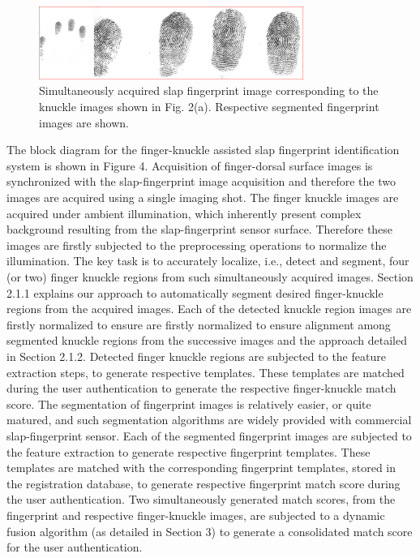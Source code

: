 \begin{figure}[!ht]
    \centering
    \includegraphics[width=3.4in]{Figures/4-4-2-fingerprint.png}
    \caption{Simultaneously acquired slap fingerprint image corresponding to the knuckle images shown in Fig. 2(a). Respective segmented fingerprint images are shown.}
    \label{capture-finerprint}
\end{figure}

The block diagram for the finger-knuckle assisted slap fingerprint identification system is shown in Figure 4. Acquisition of finger-dorsal surface images is synchronized with the slap-fingerprint image acquisition and therefore the two images are acquired using a single imaging shot. The finger knuckle images are acquired under ambient illumination, which inherently present complex background resulting from the slap-fingerprint sensor surface. Therefore these images are firstly subjected to the preprocessing operations to normalize the illumination. The key task is to accurately localize, i.e., detect and segment, four (or two) finger knuckle regions from such simultaneously acquired images. Section 2.1.1 explains our approach to automatically segment desired finger-knuckle regions from the acquired images. Each   of   the   detected   knuckle   region   images  are  firstly normalized to ensure are  firstly normalized to ensure alignment among segmented knuckle regions from the successive images and the approach detailed in Section 2.1.2. Detected finger knuckle regions are subjected to the feature extraction steps, to generate respective templates. These templates are matched during the user authentication to generate the respective finger-knuckle match score. The segmentation of fingerprint images is relatively easier, or quite matured, and such segmentation algorithms are widely provided with commercial slap-fingerprint sensor. Each of the segmented fingerprint images are subjected to the feature extraction to generate respective fingerprint templates. These templates are matched with the corresponding fingerprint templates, stored in the registration database, to generate respective fingerprint match score during the user authentication. Two simultaneously generated match scores, from the fingerprint and respective finger-knuckle images, are subjected to a dynamic fusion algorithm (as detailed in Section 3) to generate a consolidated match score for the user authentication.  

